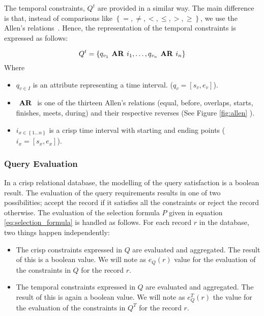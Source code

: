 The temporal constraints, $Q^t$ are provided in a similar way. The main difference is that, instead of comparisons like $\left \lbrace =, \neq, <, \leq, >, \geq \right \rbrace$, we use the Allen's relations~\cite{Allen1983}. Hence, the representation of the temporal constraints is expressed as follows:

\begin{equation}
\label{eq:temporal-constratins}
Q^{t} = \left \lbrace q_{v_1}  \mbox{\textbf{ AR }} i_1, \ldots, q_{v_n}  \mbox{\textbf{ AR }} i_n \right \rbrace
\end{equation}
Where
\begin{itemize}
\item $q_{v \in I}$ is an attribute representing a time interval. ($q_v =  \left[s_v, e_v \right]$).
\item $\mbox{\textbf{ AR }}$ is one of the thirteen Allen's relations (equal, before, overlaps, starts, finishes, meets, during) and their respective reverses (See Figure \ref{fig:allen} ).
\item $i_{x \in \left \lbrace 1 \ldots n\right \rbrace}$ is a crisp time interval with starting and ending points ($i_x = \left[s_x, e_x \right]$).

\end{itemize}


\subsubsection{\label{crisp-query-eval}Query Evaluation}
In a crisp relational database, the modelling of the query satisfaction is a boolean result. The evaluation of the query requirements results in one of two possibilities; accept the record if it satisfies all the constraints or reject the record otherwise. The evaluation of the selection formula $P$ given in equation \eqref{eq:selection_formula} is handled as follows. For each record $r$ in the database, two things happen independently:

\begin{itemize}
 \item The crisp constraints expressed in $Q$ are evaluated and aggregated. The result of this is a boolean value. We will note as $e_Q(r)$ value for the evaluation of the constraints in  $Q$ for the record $r$.
\item The temporal constraints expressed in $Q$ are evaluated and aggregated. The result of this is again a boolean value. We will note as $e_Q^{T}(r)$ the value for the evaluation of the constraints in $Q^T$ for the record $r$.
\end{itemize}

